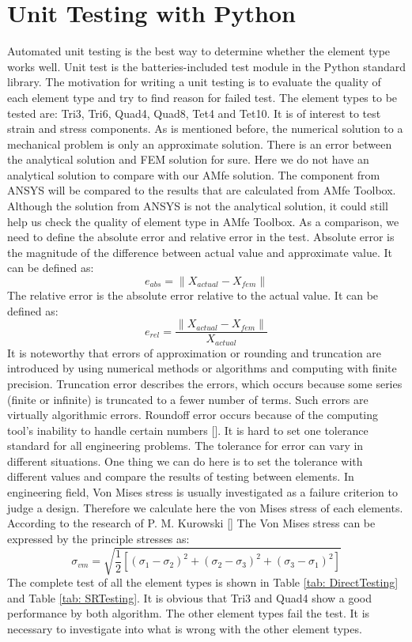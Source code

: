\section{Unit Testing with Python}
Automated unit testing is the best way to determine whether the element type works well. Unit test is the batteries-included test module in the Python standard library. The motivation for writing a unit testing is to evaluate the quality of each element type and try to find reason for failed test. The element types to be tested are: Tri3, Tri6, Quad4, Quad8, Tet4 and Tet10. It is of interest to test strain and stress components. As is mentioned before, the numerical solution to a mechanical problem is only an approximate solution. There is an error between the analytical solution and FEM solution for sure. Here we do not have an analytical solution to compare with our AMfe solution. The component from ANSYS will be compared to the results that are calculated from AMfe Toolbox. Although the solution from ANSYS is not the analytical solution, it could still help us check the quality of element type in AMfe Toolbox. As a comparison, we need to define the absolute error and relative error in the test. Absolute error is the magnitude of the difference between actual value and approximate value. It can be defined as:
\begin{equation}
e_{abs} = \|X_{actual} - X_{fem} \|
\end{equation}
The relative error is the absolute error relative to the actual value. It can be defined as:
\begin{equation}
e_{rel} = \frac{\|X_{actual} - X_{fem} \|}{X_{actual}}
\end{equation} 
It is noteworthy that errors of approximation or rounding and truncation are introduced by using numerical methods or algorithms and computing with finite precision. Truncation error describes the errors, which occurs because some series (finite or infinite) is truncated to a fewer number of terms. Such errors are virtually algorithmic errors. Roundoff error occurs because of the computing tool's inability to handle certain numbers [\cite{NumericalMethod}]. It is hard to set one tolerance standard for all engineering problems. The tolerance for error can vary in different situations. One thing we can do here is to set the tolerance with different values and compare the results of testing between elements. 
In engineering field, Von Mises stress is usually investigated as a failure criterion to judge a design. Therefore we calculate here the von Mises stress of each elements. According to the research of P. M. Kurowski [\cite{VonMiese}] The Von Mises stress can be expressed by the principle stresses as:
\begin{equation}
\sigma_{vm} = \sqrt{\frac{1}{2}\left[\left(\sigma_1 - \sigma_2\right)^2 + \left(\sigma_2 - \sigma_3\right)^2 + \left(\sigma_3 - \sigma_1\right)^2\right]}
\end{equation}
The complete test of all the element types is shown in Table \ref{tab: DirectTesting} and Table \ref{tab: SRTesting}. It is obvious that Tri3 and Quad4 show a good performance by both algorithm. The other element types fail the test. It is necessary to investigate into what is wrong with the other element types. 

